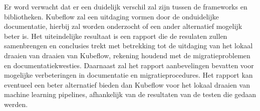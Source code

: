 Er word verwacht dat er een duidelijk verschil zal zijn tussen de frameworks en bibliotheken. Kubeflow zal een uitdaging vormen door de onduidelijke documentatie, hierbij zal worden onderzocht of een ander alternatief mogelijk beter is.
Het uiteindelijke resultaat is een rapport die de resulaten zullen samenbrengen en conclusies trekt met betrekking tot de uitdaging van het lokaal draaien van draaien van Kubeflow, rekening houdend met de migratieproblemen en documentatiekwesties. Daarnaast zal het rapport aanbevelingen bevatten voor mogelijke verbeteringen in documentatie en migratieprocedures. Het rapport kan eventueel een beter alternatief bieden dan Kubeflow voor het lokaal draaien van machine learning pipelines, afhankelijk van de resultaten van de testen die gedaan werden.



